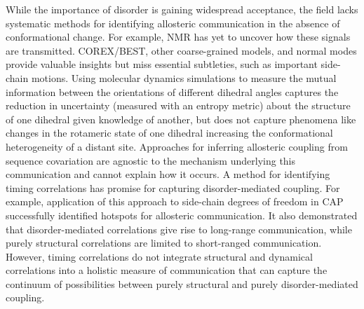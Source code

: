 \documentclass[../main.tex]{subfiles}
\begin{document}
    While the importance of disorder is gaining widespread acceptance, the field lacks systematic methods for identifying allosteric communication in the absence of conformational change. For example, NMR has yet to uncover how these signals are transmitted. COREX/BEST\cite{Hilser:2007je,Hilser:1998cj,Hilser:1996ft}, other coarse-grained models\cite{Weinkam:2012jf}, and normal modes\cite{Marcos:2011dr} provide valuable insights but miss essential subtleties, such as important side-chain motions. Using molecular dynamics simulations to measure the mutual information between the orientations of different dihedral angles captures the reduction in uncertainty (measured with an entropy metric) about the structure of one dihedral given knowledge of another\cite{Lenaerts:2008kn,McClendon:2009gd,Dubay:2011ey}, but does not capture phenomena like changes in the rotameric state of one dihedral increasing the conformational heterogeneity of a distant site. Approaches for inferring allosteric coupling from sequence covariation\cite{Lockless:1999uf,Suel:2003ca} are agnostic to the mechanism underlying this communication and cannot explain how it occurs. A method for identifying timing correlations has promise for capturing disorder-mediated coupling\cite{Lin:2016gi}. For example, application of this approach to side-chain degrees of freedom in CAP successfully identified hotspots for allosteric communication.  It also demonstrated that disorder-mediated correlations give rise to long-range communication, while purely structural correlations are limited to short-ranged communication. However, timing correlations do not integrate structural and dynamical correlations into a holistic measure of communication that can capture the continuum of possibilities between purely structural and purely disorder-mediated coupling. 
\end{document}
